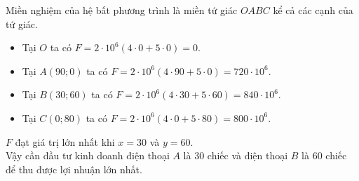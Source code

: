 \begin{bt}
{\begin{center}
\end{center}
Miền nghiệm của hệ bất phương trình là miền tứ giác $OABC$ kể cả các cạnh của tứ giác.
\begin{itemize}
	\item Tại $O$ ta có $F=2\cdot 10^6(4\cdot 0+5\cdot 0)=0$.
	\item Tại $A(90;0)$ ta có $F=2\cdot 10^6(4\cdot 90+5\cdot 0)=720\cdot 10^6$.
	\item Tại $B(30;60)$ ta có $F=2\cdot 10^6(4\cdot 30+5\cdot 60)=840\cdot 10^6$.
	\item Tại $C(0;80)$ ta có $F=2\cdot 10^6(4\cdot 0+5\cdot 80)=800\cdot 10^6$.
\end{itemize}
$F$ đạt giá trị lớn nhất khi $x=30$ và $y=60$.\\
Vậy cần đầu tư kinh doanh điện thoại $A$ là $30$ chiếc và điện thoại $B$ là $60$ chiếc để thu được lợi nhuận lớn nhất.
	}
\end{bt}

